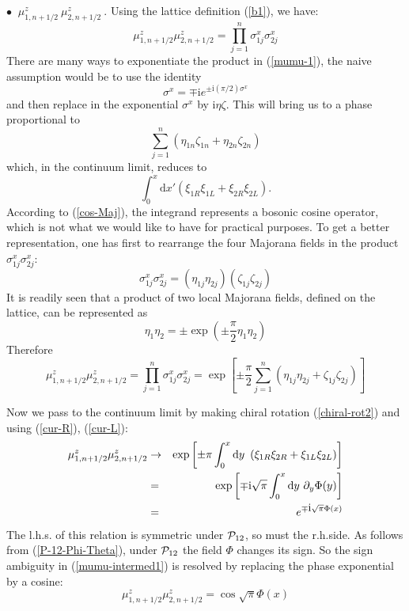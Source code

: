$\bullet~$ \underline{$\mu^z _{1,n+1/2}~ \mu^z _{2,n+1/2}$}$~$.
Using the lattice definition (\ref{b1}), we have:
\begin{equation}
\mu^z _{1,n+1/2} \mu^z _{2,n+1/2}
= \prod_{j=1}^{n} \sigma^x _{1j} \sigma^x _{2j}
\label{mumu-1}
\end{equation}
There are many ways to exponentiate the product in (\ref{mumu-1}), the naive
assumption
would be to use the identity
$$
\sigma^x = \mp \mbox{i} e^{\pm \mbox{i} (\pi/2) \sigma^x}
$$
and then replace in the exponential $\sigma^x$ by $\mbox{i} \eta \zeta$. This will bring
us
to a phase proportional to
$$
\sum_{j=1}^{n} \left( \eta_{1n} \zeta_{1n} +\eta_{2n} \zeta_{2n} \right)
$$
which, in the continuum limit, reduces to
$$
\int_{0}^{x} \mbox{d} x' \left( \xi_{1R} \xi_{1L} + \xi_{2R} \xi_{2L} \right).
$$
According to (\ref{cos-Maj}), the integrand represents a bosonic cosine
operator,
which is not what we would like to have for practical purposes.
To get a better representation, one has first to rearrange the four Majorana
fields in
the product $\sigma^x _{1j} \sigma^x _{2j}$:
\begin{equation}
\sigma^x _{1j} \sigma^x _{2j}
= \left( \eta_{1j} \eta_{2j} \right) \left(\zeta_{1j} \zeta_{2j} \right)
\end{equation}
It is readily seen that a product of two local Majorana fields, defined on the
lattice,
can be represented as
\begin{equation}
\eta_1 \eta_2 = \pm \exp \left( \pm \frac{\pi}{2}\eta_1 \eta_2 \right)
\end{equation}
Therefore
\begin{equation}
\mu^z _{1,n+1/2} \mu^z _{2,n+1/2} = \prod_{j=1}^n \sigma^x _{1j} \sigma^x _{2j} =
\exp \left[ \pm \frac{\pi}{2} \sum_{j=1}^n \left( \eta_{1j} \eta_{2j} + \zeta_{1j} \zeta_{2j}\right)  \right]
\end{equation}

Now we pass to the continuum limit by making chiral rotation (\ref{chiral-rot2})
and using (\ref{cur-R}), (\ref{cur-L}):
\begin{eqnarray}
\mu^z _{1,n+1/2} \mu^z _{2,n+1/2} &\rightarrow&
\exp \left[\pm \pi \int_0 ^x \mbox{d} y~\left( \xi_{1R} \xi_{2R} + \xi_{1L} \xi_{2L} \right) \right]\nonumber\\
&=& \exp \left[ \mp \mbox{i} \sqrt{\pi} \int_0 ^x \mbox{d} y~ \partial_y \Phi (y) \right] \nonumber\\
&=& e^{\mp \mbox{i} \sqrt{\pi} \Phi (x)} \label{mumu-intermed1}
\end{eqnarray}
The l.h.s. of this relation is symmetric under ${\cal{P}}_{12}$, so must
the r.h.side. As follows from (\ref{P-12-Phi-Theta}),
under ${\cal{P}}_{12}$ the field $\Phi$ changes its sign.
So the sign ambiguity in (\ref{mumu-intermed1}) is resolved by
replacing the phase exponential by a cosine:
\begin{equation}
\mu^z _{1,n+1/2} \mu^z _{2,n+1/2} = \cos \sqrt{\pi} \Phi(x)
\label{mumu-fin}
\end{equation}
\medskip

